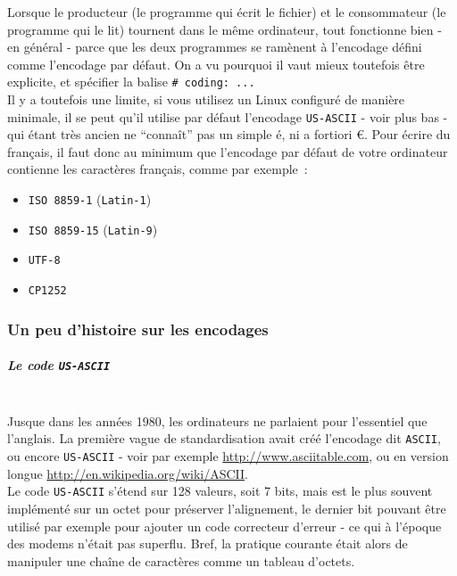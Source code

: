     Lorsque le producteur (le programme qui écrit le fichier) et le
consommateur (le programme qui le lit) tournent dans le même ordinateur,
tout fonctionne bien - en général - parce que les deux programmes se
ramènent à l'encodage défini comme l'encodage par défaut. On a vu
pourquoi il vaut mieux toutefois être explicite, et spécifier la balise
\texttt{\#\ coding:\ ...}\\

Il y a toutefois une limite, si vous utilisez un Linux configuré de
manière minimale, il se peut qu'il utilise par défaut l'encodage
\texttt{US-ASCII} - voir plus bas - qui étant très ancien ne ``connaît''
pas un simple é, ni a fortiori €. Pour écrire du français, il faut donc
au minimum que l'encodage par défaut de votre ordinateur contienne les
caractères français, comme par exemple~:

\begin{itemize}
	\item
	\texttt{ISO\ 8859-1} (\texttt{Latin-1})
	\item
	\texttt{ISO\ 8859-15} (\texttt{Latin-9})
	\item
	\texttt{UTF-8}
	\item
	\texttt{CP1252}
\end{itemize}

    \hypertarget{un-peu-dhistoire-sur-les-encodages}{%
\subsubsection{Un peu d'histoire sur les
encodages}\label{un-peu-dhistoire-sur-les-encodages}}

    \hypertarget{le-code-us-ascii}{%
\subparagraph{\texorpdfstring{Le code
\texttt{US-ASCII}\\\\}{Le code US-ASCII}}\label{le-code-us-ascii}}

    Jusque dans les années 1980, les ordinateurs ne parlaient pour
l'essentiel que l'anglais. La première vague de standardisation avait
créé l'encodage dit \texttt{ASCII}, ou encore \texttt{US-ASCII} - voir
par exemple \href{http://www.asciitable.com}{http://www.asciitable.com}, ou en version longue
\href{http://en.wikipedia.org/wiki/ASCII}{http://en.wikipedia.org/wiki/ASCII}.\\

Le code \texttt{US-ASCII} s'étend sur 128 valeurs, soit 7 bits, mais est
le plus souvent implémenté sur un octet pour préserver l'alignement, le
dernier bit pouvant être utilisé par exemple pour ajouter un code
correcteur d'erreur - ce qui à l'époque des modems n'était pas superflu.
Bref, la pratique courante était alors de manipuler une chaîne de
caractères comme un tableau d'octets.

